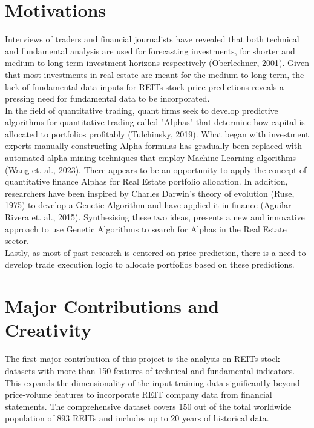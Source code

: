 \documentclass[a4paper,12pt]{report}
\numberwithin{equation}{section}
\theoremstyle{definition}
\begin{document}
\section{Motivations}
Interviews of traders and financial journalists have revealed that both technical and fundamental analysis are used for forecasting investments, for shorter and medium to long term investment horizons respectively (Oberlechner, 2001). Given that most investments in real estate are meant for the medium to long term, the lack of fundamental data inputs for REITs stock price predictions reveals a pressing need for fundamental data to be incorporated. \\ 

In the field of quantitative trading, quant firms seek to develop predictive algorithms for quantitative trading called "Alphas" that determine how capital is allocated to portfolios profitably (Tulchinsky, 2019). What began with investment experts manually constructing Alpha formulas has gradually been replaced with automated alpha mining techniques that employ Machine Learning algorithms (Wang et. al., 2023). There appears to be an opportunity to apply the concept of quantitative finance Alphas for Real Estate portfolio allocation. In addition, researchers have been inspired by Charles Darwin's theory of evolution (Ruse, 1975) to develop a Genetic Algorithm and have applied it in finance (Aguilar-Rivera et. al., 2015). Synthesising these two ideas, presents a new and innovative approach to use Genetic Algorithms to search for Alphas in the Real Estate sector. \\

Lastly, as most of past research is centered on price prediction, there is a need to develop trade execution logic to allocate portfolios based on these predictions.



\section{Major Contributions and Creativity}
The first major contribution of this project is the analysis on REITs stock datasets with more than 150 features of technical and fundamental indicators. This expands the dimensionality of the input training data significantly beyond price-volume features to incorporate REIT company data from financial statements. The comprehensive dataset covers 150 out of the total worldwide population of 893 REITs and includes up to 20 years of historical data.\\
\end{document}
